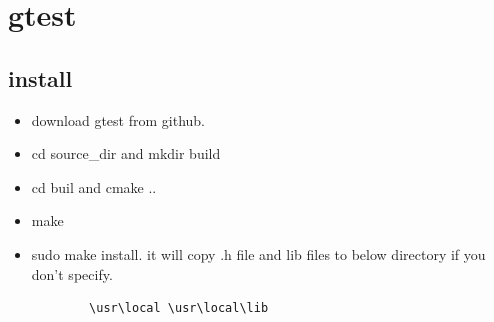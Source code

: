 \documentclass[a4paper,11pt,twoside]{book}
\begin{document}
\section{gtest}
\subsection{install}
\begin{itemize}
	\item download gtest from github.
	\item cd source\_dir and mkdir build
	\item cd buil and cmake ..
	\item make 
	\item sudo make install. it will copy .h file and lib files to below directory if you don't specify.
	\begin{lstlisting}
		\usr\local \usr\local\lib
	\end{lstlisting}
\end{itemize}
\end{document}
